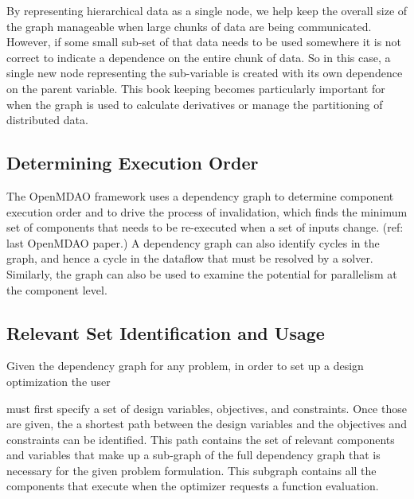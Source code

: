 \documentclass[]{aiaa-tc} %
\begin{document}
    By representing hierarchical data as a single node, we help keep the overall size of the graph manageable
    when large chunks of data are being communicated. However, if some small sub-set of that data needs to be
    used somewhere it is not correct to indicate a dependence on the entire chunk of data. So in this case, a
    single new node representing the sub-variable is created with its own dependence on the parent variable.
    This book keeping becomes particularly important for when the graph is used to calculate derivatives or
    manage the partitioning of distributed data.


    \subsection{Determining Execution Order}

    The OpenMDAO framework uses a dependency graph to determine component execution order and to
    drive the process of invalidation, which finds the minimum set of components that needs to
    be re-executed when a set of inputs change. (ref: last OpenMDAO paper.) A dependency graph
    can also identify cycles in the graph, and hence a cycle in the dataflow that must be resolved
    by a solver. Similarly, the graph can also be used to examine the potential for parallelism at
    the component level.

    \subsection{Relevant Set Identification and Usage}
    Given the dependency graph for any problem, in order to set up a design optimization the user

    must first specify a set of design variables, objectives, and constraints. Once those are given,
    the a shortest path between the design variables and the objectives and constraints can be identified.
    This path contains the set of relevant components and variables that make up a sub-graph of the full
    dependency graph that is necessary for the given problem formulation. This subgraph
    contains all the components that execute when the optimizer requests a function evaluation.
\end{document}
